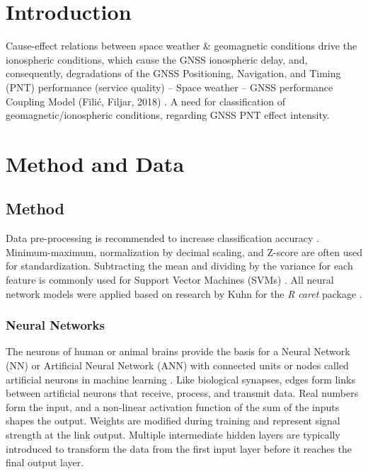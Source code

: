 \documentclass[preprint,12pt]{elsarticle}
\begin{document}
\section{Introduction}
Cause-effect relations between space weather \& geomagnetic conditions drive the ionospheric
conditions, which cause the GNSS ionospheric delay, and, consequently, degradations of the GNSS
Positioning, Navigation, and Timing (PNT) performance (service quality) – Space weather – GNSS
performance Coupling Model (Fili\'{c}, Filjar, 2018) \cite{filic2018modelling}.
A need for classification of geomagnetic/ionospheric conditions, regarding GNSS PNT effect
intensity.
\cite{filjar2024ambient, filjar2022application, sikirica2021risk, filjar2020comparison}

\section{Method and Data}

\subsection{Method}

Data pre-processing is recommended to increase classification accuracy \cite{Fan2008}. Minimum-maximum, normalization by decimal scaling, and Z-score \cite{Mohamad2013} are often used for standardization. Subtracting the mean and dividing by the variance for each feature is commonly used for Support Vector Machines (SVMs) \cite{Fennell2019}.
All neural network models were applied based on research by Kuhn for the \textit{R} \textit{caret} package \cite{kuhn2013applied, topepoCaretPackage, rprojectProjectStatistical}.

\subsubsection{Neural Networks}

The neurons of human or animal brains provide the basis for a Neural Network (NN) or Artificial Neural Network (ANN) with connected units or nodes called artificial neurons in machine learning \cite{mitExplainedNeural, brahme2014comprehensive}. Like biological synapses, edges form links between artificial neurons that receive, process, and transmit data. Real numbers form the input, and a non-linear activation function of the sum of the inputs shapes the output. Weights are modified during training and represent signal strength at the link output. Multiple intermediate hidden layers are typically introduced to transform the data from the first input layer before it reaches the final output layer. 
\end{document}

